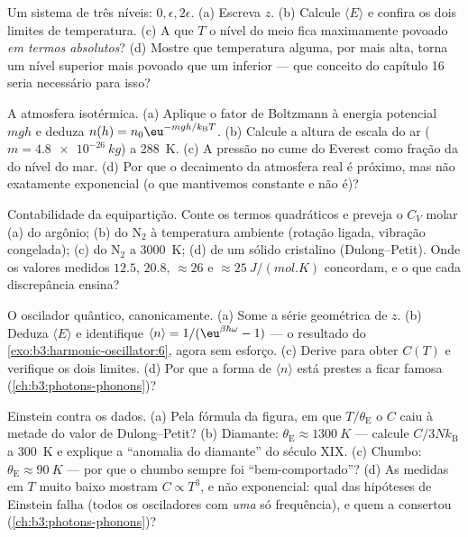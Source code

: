 \begin{exercise}[$\star$]\label{exo:b3:canonical-ensemble:2}
Um sistema de três níveis: $0, \epsilon, 2\epsilon$. (a) Escreva $z$.
(b) Calcule $\langle E\rangle$ e confira os dois limites de
temperatura. (c) A que $T$ o nível do meio fica maximamente povoado
\emph{em termos absolutos}? (d) Mostre que temperatura alguma, por mais
alta, torna um nível superior mais povoado que um inferior --- que
conceito do capítulo 16 seria necessário para isso?
\end{exercise}

\begin{exercise}[$\star$]\label{exo:b3:canonical-ensemble:3}
A atmosfera isotérmica. (a) Aplique o fator de Boltzmann à energia
potencial $mgh$ e deduza $n(h) = n_0\eu^{-mgh/k_{\text{B}}
T}$. (b) Calcule a altura de escala do ar ($m = \qty{4.8e-26}{kg}$) a
\qty{288}{K}. (c) A pressão no cume do Everest como fração da do nível
do mar. (d) Por que o decaimento da atmosfera real é próximo, mas não
exatamente exponencial (o que mantivemos constante e não é)?
\end{exercise}

\begin{exercise}[$\star$]\label{exo:b3:canonical-ensemble:4}
Contabilidade da equipartição. Conte os termos quadráticos e preveja o
$C_V$ molar (a) do argônio; (b) do N$_2$ à temperatura ambiente
(rotação ligada, vibração congelada); (c) do N$_2$ a \qty{3000}{K}; (d)
de um sólido cristalino (Dulong--Petit). Onde os valores medidos
$12.5$, $20.8$, $\approx26$ e $\approx\qty{25}{J/(mol.K)}$ concordam, e
o que cada discrepância ensina?
\end{exercise}

\begin{exercise}[$\star\star$]\label{exo:b3:canonical-ensemble:5}
O oscilador quântico, canonicamente. (a) Some a série geométrica de
$z$. (b) Deduza $\langle E\rangle$ e identifique $\langle
n\rangle = 1/(\eu^{\beta\hbar\omega} - 1)$ --- o resultado do
\cref{exo:b3:harmonic-oscillator:6}, agora sem esforço. (c) Derive para
obter $C(T)$ e verifique os dois limites. (d) Por que a forma de
$\langle n\rangle$ está prestes a ficar famosa
(\cref{ch:b3:photons-phonons})?
\end{exercise}

\begin{exercise}[$\star\star$]\label{exo:b3:canonical-ensemble:6}
Einstein contra os dados. (a) Pela fórmula da figura, em que
$T/\theta_{\text{E}}$ o $C$ caiu à metade do valor de Dulong--Petit?
(b) Diamante: $\theta_{\text{E}} \approx \qty{1300}{K}$ --- calcule
$C/3Nk_{\text{B}}$ a \qty{300}{K} e explique a ``anomalia do diamante''
do século XIX. (c) Chumbo: $\theta_{\text{E}}
\approx \qty{90}{K}$ --- por que o chumbo sempre foi ``bem-comportado''?
(d) As medidas em $T$ muito baixo mostram $C \propto T^3$, e não
exponencial: qual das hipóteses de Einstein falha (todos os
osciladores com \emph{uma} só frequência), e quem a consertou
(\cref{ch:b3:photons-phonons})?
\end{exercise}

